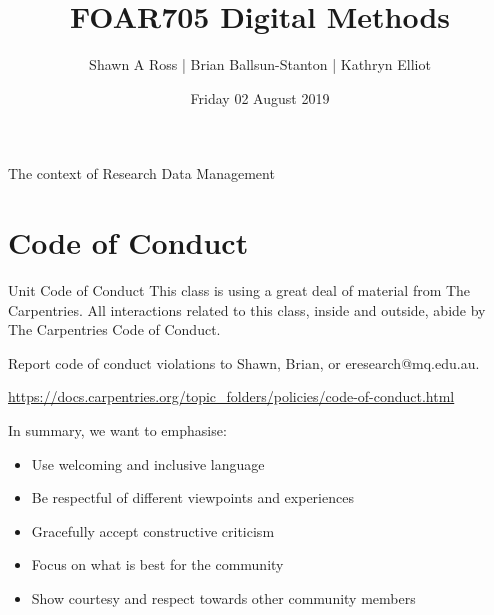 \documentclass[aspectratio=169, 11pt]{beamer} %
\title{FOAR705 Digital Methods} %
\author{Shawn A Ross | Brian Ballsun-Stanton | Kathryn Elliot}               %
\institute{Faculty of Arts}         %
\date{Friday 02 August 2019}                 %
\begin{document}

\maketitle

  

\begin{frame}{The context of Research Data Management}
  \tableofcontents
\end{frame}

%

\section{Code of Conduct}

\begin{frame}{Unit Code of Conduct}
This class is using a great deal of material from The Carpentries. All interactions related to this class, inside and outside, abide by The Carpentries Code of Conduct.

Report code of conduct violations to Shawn, Brian, or eresearch@mq.edu.au.

\url{https://docs.carpentries.org/topic_folders/policies/code-of-conduct.html}

In summary, we want to emphasise:

\begin{itemize}[label=\textbullet]
    \item Use welcoming and inclusive language
    \item Be respectful of different viewpoints and experiences
    \item Gracefully accept constructive criticism
    \item Focus on what is best for the community
    \item Show courtesy and respect towards other community members
\end{itemize}

\end{frame}
\end{document}
